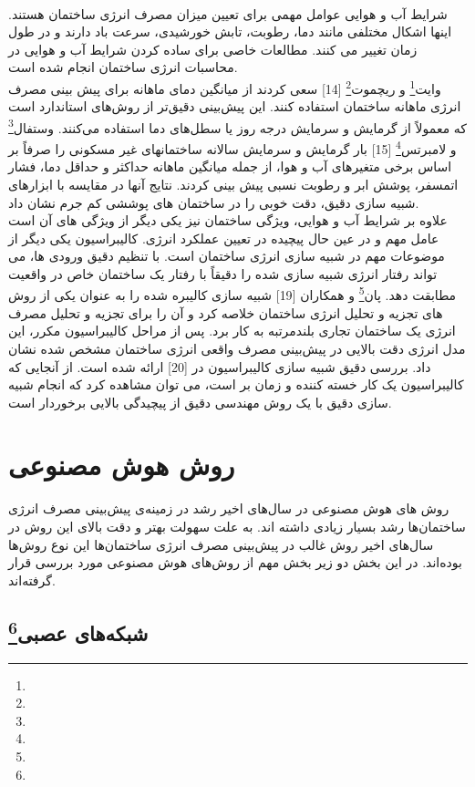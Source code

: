 \\
شرایط آب و هوایی عوامل مهمی برای تعیین میزان مصرف انرژی ساختمان هستند. اینها اشکال مختلفی مانند دما، رطوبت، تابش خورشیدی، سرعت باد دارند و در طول زمان تغییر می کنند. مطالعات خاصی برای ساده کردن شرایط آب و هوایی در محاسبات انرژی ساختمان انجام شده است.
\\
وایت\footnote{} و ریچموت\footnote{} [14] سعی کردند از میانگین دمای ماهانه برای پیش بینی مصرف انرژی ماهانه ساختمان استفاده کنند. این پیش‌بینی دقیق‌تر از روش‌های استاندارد است که معمولاً از گرمایش و سرمایش درجه روز یا سطل‌های دما استفاده می‌کنند. وستفال\footnote{} و لامبرتس\footnote{} [15] بار گرمایش و سرمایش سالانه ساختمانهای غیر مسکونی را صرفاً بر اساس برخی متغیرهای آب و هوا، از جمله میانگین ماهانه حداکثر و حداقل دما، فشار اتمسفر، پوشش ابر و رطوبت نسبی پیش بینی کردند. نتایج آنها در مقایسه با ابزارهای شبیه سازی دقیق، دقت خوبی را در ساختمان های پوششی کم جرم نشان داد.
\\
علاوه بر شرایط آب و هوایی، ویژگی ساختمان نیز یکی دیگر از ویژگی های آن است
عامل مهم و در عین حال پیچیده در تعیین عملکرد انرژی.
کالیبراسیون یکی دیگر از موضوعات مهم در شبیه سازی انرژی ساختمان است. با تنظیم دقیق ورودی ها، می تواند رفتار انرژی شبیه سازی شده را دقیقاً با رفتار یک ساختمان خاص در واقعیت مطابقت دهد. پان\footnote{} و همکاران [19] شبیه سازی کالیبره شده را به عنوان یکی از روش های تجزیه و تحلیل انرژی ساختمان خلاصه کرد و آن را برای تجزیه و تحلیل مصرف انرژی یک ساختمان تجاری بلندمرتبه به کار برد. پس از مراحل کالیبراسیون مکرر، این مدل انرژی دقت بالایی در پیش‌بینی مصرف واقعی انرژی ساختمان مشخص شده نشان داد. بررسی دقیق شبیه سازی کالیبراسیون در [20] ارائه شده است. از آنجایی که کالیبراسیون یک کار خسته کننده و زمان بر است، می توان مشاهده کرد که انجام شبیه سازی دقیق با یک روش مهندسی دقیق از پیچیدگی بالایی برخوردار است.






\section{روش هوش مصنوعی}

روش های هوش مصنوعی در سال‌های اخیر رشد در زمینه‌ی پیش‌بینی مصرف انرژی ساختمان‌ها رشد بسیار زیادی داشته اند. به علت سهولت بهتر و دقت بالای این روش در سال‌های اخیر روش غالب در پیش‌بینی مصرف انرژی ساختمان‌ها این نوع روش‌ها بوده‌اند. 
در این بخش دو زیر بخش مهم از روش‌های هوش مصنوعی مورد بررسی قرار گرفته‌اند. 

\subsection{شبکه‌های عصبی\footnote{}}

